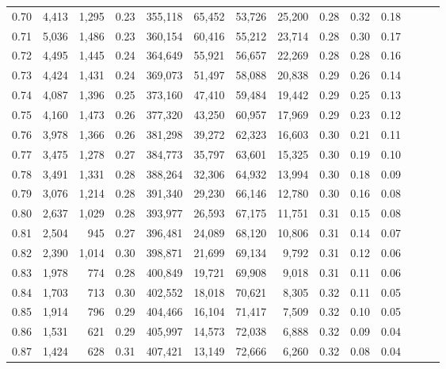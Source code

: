 \begin{tabular}{rrrrrrrrrrrrrr}
0.70 &   4,413 &  1,295 &  0.23 &  355,118 &   65,452 &  53,726 &  25,200 &  0.28 &  0.32 &      0.18 \\
0.71 &   5,036 &  1,486 &  0.23 &  360,154 &   60,416 &  55,212 &  23,714 &  0.28 &  0.30 &      0.17 \\
0.72 &   4,495 &  1,445 &  0.24 &  364,649 &   55,921 &  56,657 &  22,269 &  0.28 &  0.28 &      0.16 \\
0.73 &   4,424 &  1,431 &  0.24 &  369,073 &   51,497 &  58,088 &  20,838 &  0.29 &  0.26 &      0.14 \\
0.74 &   4,087 &  1,396 &  0.25 &  373,160 &   47,410 &  59,484 &  19,442 &  0.29 &  0.25 &      0.13 \\
0.75 &   4,160 &  1,473 &  0.26 &  377,320 &   43,250 &  60,957 &  17,969 &  0.29 &  0.23 &      0.12 \\
0.76 &   3,978 &  1,366 &  0.26 &  381,298 &   39,272 &  62,323 &  16,603 &  0.30 &  0.21 &      0.11 \\
0.77 &   3,475 &  1,278 &  0.27 &  384,773 &   35,797 &  63,601 &  15,325 &  0.30 &  0.19 &      0.10 \\
0.78 &   3,491 &  1,331 &  0.28 &  388,264 &   32,306 &  64,932 &  13,994 &  0.30 &  0.18 &      0.09 \\
0.79 &   3,076 &  1,214 &  0.28 &  391,340 &   29,230 &  66,146 &  12,780 &  0.30 &  0.16 &      0.08 \\
0.80 &   2,637 &  1,029 &  0.28 &  393,977 &   26,593 &  67,175 &  11,751 &  0.31 &  0.15 &      0.08 \\
0.81 &   2,504 &    945 &  0.27 &  396,481 &   24,089 &  68,120 &  10,806 &  0.31 &  0.14 &      0.07 \\
0.82 &   2,390 &  1,014 &  0.30 &  398,871 &   21,699 &  69,134 &   9,792 &  0.31 &  0.12 &      0.06 \\
0.83 &   1,978 &    774 &  0.28 &  400,849 &   19,721 &  69,908 &   9,018 &  0.31 &  0.11 &      0.06 \\
0.84 &   1,703 &    713 &  0.30 &  402,552 &   18,018 &  70,621 &   8,305 &  0.32 &  0.11 &      0.05 \\
0.85 &   1,914 &    796 &  0.29 &  404,466 &   16,104 &  71,417 &   7,509 &  0.32 &  0.10 &      0.05 \\
0.86 &   1,531 &    621 &  0.29 &  405,997 &   14,573 &  72,038 &   6,888 &  0.32 &  0.09 &      0.04 \\
0.87 &   1,424 &    628 &  0.31 &  407,421 &   13,149 &  72,666 &   6,260 &  0.32 &  0.08 &      0.04 \\

\end{tabular}
